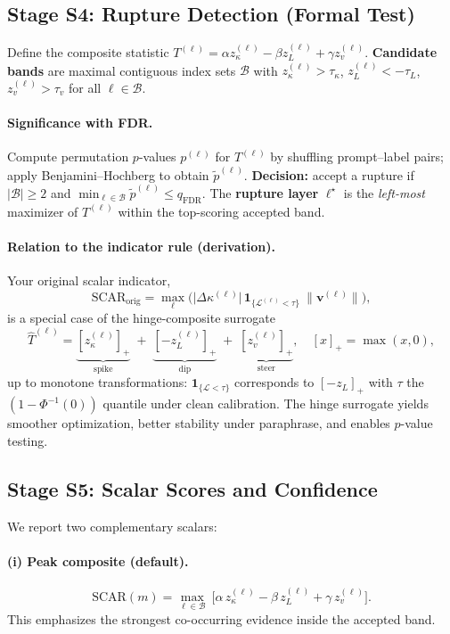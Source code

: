\documentclass[11pt]{article}
\begin{document}
\subsection{Stage S4: Rupture Detection (Formal Test)}
\label{subsec:scar-rupture-detect}
Define the composite statistic $T^{(\ell)}=\alpha z_\kappa^{(\ell)}-\beta z_L^{(\ell)}+\gamma z_v^{(\ell)}$.  
\textbf{Candidate bands} are maximal contiguous index sets $\mathcal{B}$ with $z_\kappa^{(\ell)}>\tau_\kappa$, $z_L^{(\ell)}<-\tau_L$, $z_v^{(\ell)}>\tau_v$ for all $\ell\in\mathcal{B}$.

\paragraph{Significance with FDR.}
Compute permutation $p$-values $p^{(\ell)}$ for $T^{(\ell)}$ by shuffling prompt–label pairs; apply Benjamini–Hochberg to obtain $\tilde p^{(\ell)}$.  
\textbf{Decision:} accept a rupture if $|\mathcal{B}|\ge2$ and $\min_{\ell\in\mathcal{B}}\tilde p^{(\ell)}\le q_{\mathrm{FDR}}$.
The \textbf{rupture layer} $\ell^\star$ is the \emph{left-most} maximizer of $T^{(\ell)}$ within the top-scoring accepted band.

\paragraph{Relation to the indicator rule (derivation).}
Your original scalar indicator,
\[
\mathrm{SCAR}_{\text{orig}}=\max_\ell \Big(\big|\Delta\kappa^{(\ell)}\big|\,\mathbf{1}_{\{\mathcal{L}^{(\ell)}<\tau\}}\ \|\mathbf{v}^{(\ell)}\|\Big),
\]
is a special case of the hinge-composite surrogate
\[
\widehat{T}^{(\ell)}=\underbrace{[z_\kappa^{(\ell)}]_+}_{\text{spike}}
\;+\; \underbrace{[-z_L^{(\ell)}]_+}_{\text{dip}}
\;+\; \underbrace{[z_v^{(\ell)}]_+}_{\text{steer}},
\quad [x]_+=\max(x,0),
\]
up to monotone transformations: $\mathbf{1}_{\{\mathcal{L}<\tau\}}$ corresponds to $[-z_L]_+$ with $\tau$ the $(1-\Phi^{-1}(0))$ quantile under clean calibration. The hinge surrogate yields smoother optimization, better stability under paraphrase, and enables $p$-value testing.

\subsection{Stage S5: Scalar Scores and Confidence}
\label{subsec:scar-score}
We report two complementary scalars:

\paragraph{(i) Peak composite (default).}
\[
\mathrm{SCAR}(m)=\max_{\ell\in\mathcal{B}}\ \Big[\alpha\,z_\kappa^{(\ell)}-\beta\,z_L^{(\ell)}+\gamma\,z_v^{(\ell)}\Big].
\]
This emphasizes the strongest co-occurring evidence inside the accepted band.
\end{document}
